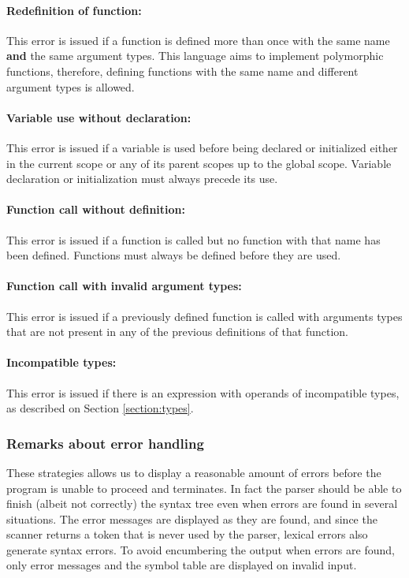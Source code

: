 \paragraph{Redefinition of function:} This error is issued if a function is
defined more than once with the same name \textbf{and} the same argument types.
This language aims to implement polymorphic functions, therefore, defining functions
with the same name and different argument types is allowed.

\paragraph{Variable use without declaration:} This error is issued if a variable is
used before being declared or initialized either in the current scope or any of its
parent scopes up to the global scope. Variable declaration or initialization must
always precede its use.

\paragraph{Function call without definition:} This error is issued if a function
is called but no function with that name has been defined. Functions must always
be defined before they are used.

\paragraph{Function call with invalid argument types:} This error is issued if a
previously defined function is called with arguments types that are not present
in any of the previous definitions of that function.

\paragraph{Incompatible types:} This error is issued if there is an expression
with operands of incompatible types, as described on Section \ref{section:types}.

\subsubsection{Remarks about error handling}
These strategies allows us to display a reasonable amount of errors before the program is unable
to proceed and terminates. In fact the parser should be able to finish (albeit not correctly)
the syntax tree even when errors are found in several situations.
The error messages are displayed as they are found, and since the
scanner returns a token that is never used by the parser, lexical errors also generate syntax
errors. To avoid encumbering the output when errors are found, only error messages and the symbol
table are displayed on invalid input.

